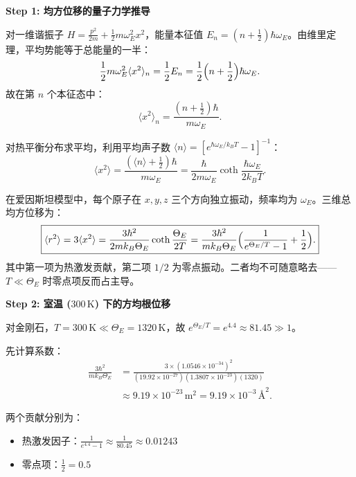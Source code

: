 \begin{derivationbox}[标准解题过程]
\textbf{Step 1: 均方位移的量子力学推导}

对一维谐振子 $H=\frac{p^2}{2m}+\frac12m\omega_E^2x^2$，能量本征值 $E_n=(n+\frac12)\hbar\omega_E$。由维里定理，平均势能等于总能量的一半：
\[
\frac12m\omega_E^2\langle x^2\rangle_n = \frac12E_n = \frac12\Bigl(n+\frac12\Bigr)\hbar\omega_E.
\]
故在第 $n$ 个本征态中：
\begin{equation}
\langle x^2\rangle_n = \frac{(n+\frac12)\hbar}{m\omega_E}.
\end{equation}

对热平衡分布求平均，利用平均声子数 $\langle n\rangle=[e^{\hbar\omega_E/k_BT}-1]^{-1}$：
\begin{equation}
\langle x^2\rangle = \frac{(\langle n\rangle+\frac12)\hbar}{m\omega_E} = \frac{\hbar}{2m\omega_E}\coth\frac{\hbar\omega_E}{2k_BT}.
\end{equation}

在爱因斯坦模型中，每个原子在 $x,y,z$ 三个方向独立振动，频率均为 $\omega_E$。三维总均方位移为：
\begin{equation}
\boxed{\langle r^2\rangle = 3\langle x^2\rangle = \frac{3\hbar^2}{2mk_B\Theta_E}\coth\frac{\Theta_E}{2T} = \frac{3\hbar^2}{mk_B\Theta_E}\Bigl(\frac{1}{e^{\Theta_E/T}-1}+\frac12\Bigr).}
\label{eq:diamond-msd-full}
\end{equation}
其中第一项为热激发贡献，第二项 $1/2$ 为零点振动。二者均不可随意略去——$T\ll\Theta_E$ 时零点项反而占主导。

\textbf{Step 2: 室温 ($300\,\mathrm{K}$) 下的方均根位移}

对金刚石，$T=300\,\mathrm{K}\ll\Theta_E=1320\,\mathrm{K}$，故 $e^{\Theta_E/T}=e^{4.4}\approx81.45\gg1$。

先计算系数：
\begin{align}
    \frac{3\hbar^2}{mk_B\Theta_E} &= \frac{3\times(1.0546\times10^{-34})^2}{(19.92\times10^{-27})(1.3807\times10^{-23})(1320)} \nonumber\\
    &\approx 9.19\times10^{-23}\,\mathrm{m^2} = 9.19\times10^{-3}\,\text{\AA}^2.
\end{align}

两个贡献分别为：
\begin{itemize}
    \item 热激发因子：$\displaystyle\frac{1}{e^{4.4}-1}\approx\frac{1}{80.45}\approx0.01243$
    \item 零点项：$\displaystyle\frac12=0.5$
\end{itemize}


\end{derivationbox}
